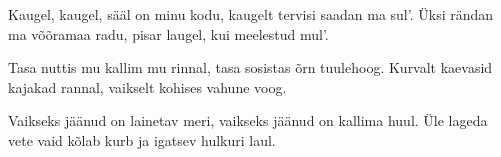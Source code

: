 Kaugel, kaugel, s\"a\"al on minu kodu,
kaugelt tervisi saadan ma sul'.
\"Uksi r\"andan ma v\~o\~oramaa radu,
pisar laugel, kui meelestud mul'.

Tasa nuttis mu kallim mu rinnal,
tasa sosistas \~orn tuulehoog.
Kurvalt kaevasid kajakad rannal,
vaikselt kohises vahune voog.

Vaikseks j\"a\"anud on lainetav meri,
vaikseks j\"a\"anud on kallima huul.
\"Ule lageda vete vaid k\~olab
kurb ja igatsev hulkuri laul.
